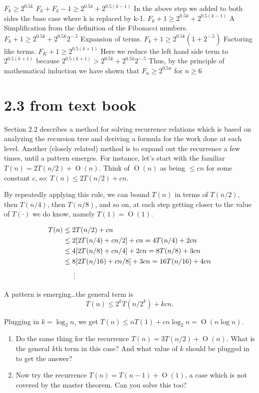 \documentclass[12pt]{article}
\newcommand{\BigO}[1]{\ensuremath{\operatorname{O}\left(#1\right)}}
\begin{document}
	$F_k \geq 2^{0.5k}$
	$F_k + F_k-1 \geq 2^{0.5k} + 2^{0.5(k-1)}$
		In the above step we added to both sides the base case where k is replaced by k-1.
	$F_k+1 \geq 2^{0.5k} + 2^{0.5(k-1)}$
		A Simplification from the definition of the Fibonacci numbers.
	$F_k+1 \geq 2^{0.5k} + 2^{0.5k}2^{-.5}$
		Expansion of terms.
	$F_k+1 \geq 2^{0.5k}(1 + 2^{-.5})$
		Factoring like terms.
	$F_K+1 \geq 2^{0.5(k+1)}$
		Here we reduce the left hand side term to $2^{0.5(k+1)}$ because $2^{0.5(k+1)} \gt 2^{0.5k}+2^{0.5k}2^{-.5}$ 
	Thus, by the principle of mathematical induction we have shown that $F_n \geq 2^{0.5n}$ for $n \geq 6$ 
	
	
\section*{2.3 from text book}
Section 2.2 describes a method for solving recurrence relations which is
based on analyzing the recursion tree and deriving a formula for the
work done at each level.  Another (closely related) method is to expand
out the recurrence a few times, until a pattern emerges. For instance,
let’s start with the familiar $T(n) = 2T(n/2) + \BigO{n}$. Think of
$\BigO{n}$ as being $\leq cn$ for some constant $c$,
so: $T(n) \leq 2T(n/2) + cn$. 

By repeatedly applying this rule, we can bound $T(n)$ in terms of $T(n/2)$,
then $T(n/4)$, then $T(n/8)$, and so on, at each step getting closer to
the value of $T(\cdot)$ we do know,
namely $T(1) = \BigO{1}$.

\begin{align*}
T (n) &\leq 2T (n/2) + cn \\
&\leq 2[2T(n/4) + cn/2] + cn = 4T(n/4) + 2cn \\
&\leq 4[2T(n/8) + cn/4] + 2cn = 8T(n/8) + 3cn \\
&\leq 8[2T(n/16) + cn/8] + 3cn = 16T(n/16) + 4cn \\
&\indent \vdots
\end{align*}

A pattern is emerging\ldots the general term is 
\[T(n) \leq 2^kT(n/2^k) + kcn.\]

Plugging in $k = \log_2{n}$, we get $T(n) \leq nT(1) + cn\log_2{n} = \BigO{n\log{n}}.$
\begin{enumerate}
\item Do the same thing for the recurrence $T(n) = 3T(n/2) + \BigO{n}$. What
is the general $k$th term
in this case? And what value of $k$ should be plugged in to get the
answer?

\item Now try the recurrence $T(n) = T( n −1 ) + \BigO{1}$, a case which is not
covered by the master theorem. Can you solve this too?
\end{enumerate}
\end{document}
